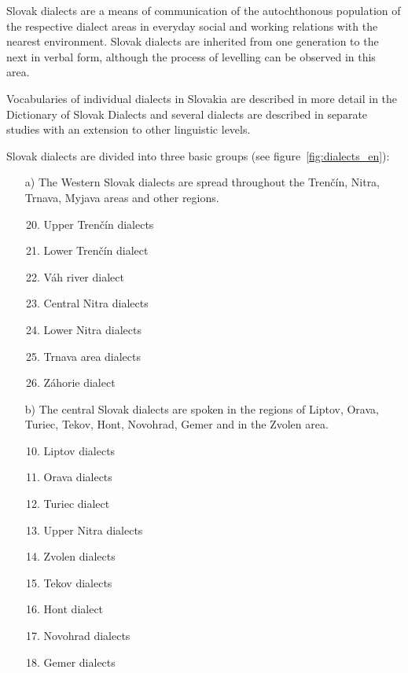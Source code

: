 Slovak dialects are a means of communication of the autochthonous population of the respective dialect areas in everyday social and working relations with the nearest environment. Slovak dialects are inherited from one generation to the next in verbal form, although the process of levelling can be observed in this area. 

Vocabularies of individual dialects in Slovakia are described in more detail in the Dictionary of Slovak Dialects and several dialects are described in separate studies with an extension to other linguistic levels.

Slovak dialects are divided into three basic groups (see figure~\ref{fig:dialects_en}):

\begin{itemize}

\item[a)] The Western Slovak dialects are spread throughout the Trenčín, Nitra, Trnava, Myjava areas and other regions.

\begin{enumerate}
\setcounter{enumi}{19}
\item Upper Trenčín dialects
\item Lower Trenčín dialect
\item Váh river dialect
\item Central Nitra dialects
\item Lower Nitra dialects
\item Trnava area dialects
\item Záhorie dialect
\end{enumerate}

\item[b)] The central Slovak dialects are spoken in the regions of Liptov, Orava, Turiec, Tekov, Hont, Novohrad, Gemer and in the Zvolen area.

\begin{enumerate}
\setcounter{enumi}{9}
\item Liptov dialects
\item Orava dialects
\item Turiec dialect
\item Upper Nitra dialects
\item Zvolen dialects
\item Tekov dialects
\item Hont dialect
\item Novohrad dialects
\item Gemer dialects
\end{enumerate}


\end{itemize}
